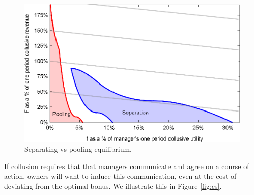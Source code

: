 \documentclass[]{article}
\begin{document}
\begin{figure}
\centering
\includegraphics[scale=0.8]{Plots/Bertrand_com_f_F_SepvsPool.eps}
\caption{Separating vs pooling equilibrium.}\label{fig:fines_pool_sep}
\end{figure}

 
If collusion requires that that managers communicate and agree on a course of action, owners will want to induce this communication, even at the cost of deviating from the optimal bonus. We illustrate this in Figure \ref{fig:cs}.%
\end{document}
